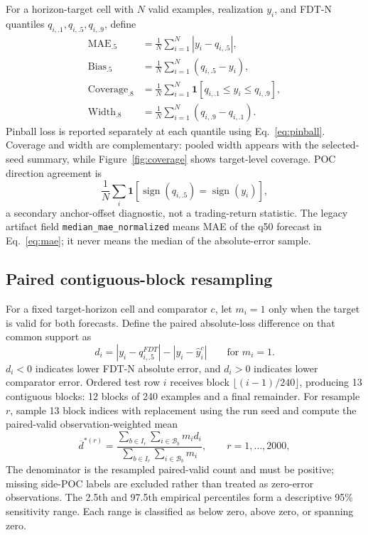 \documentclass[10pt]{article}
\newcommand{\ind}{\mathbf{1}}
\begin{document}
For a horizon-target cell with $N$ valid examples, realization $y_i$, and FDT-N quantiles
$q_{i,.1},q_{i,.5},q_{i,.9}$, define
\begin{align}
\operatorname{MAE}_{.5}&=\frac{1}{N}\sum_{i=1}^N|y_i-q_{i,.5}|,
\label{eq:mae}\\
\operatorname{Bias}_{.5}&=\frac{1}{N}\sum_{i=1}^N(q_{i,.5}-y_i),\\
\operatorname{Coverage}_{.8}&=\frac{1}{N}\sum_{i=1}^N
\ind[q_{i,.1}\le y_i\le q_{i,.9}],
\label{eq:coverage}\\
\operatorname{Width}_{.8}&=\frac{1}{N}\sum_{i=1}^N(q_{i,.9}-q_{i,.1}).
\label{eq:width}
\end{align}
Pinball loss is reported separately at each quantile using Eq.~\eqref{eq:pinball}. Coverage and width
are complementary: pooled width appears with the selected-seed summary, while
Figure~\ref{fig:coverage} shows target-level coverage. POC direction agreement is
\begin{equation}
\frac{1}{N}\sum_i\ind[\operatorname{sign}(q_{i,.5})=
\operatorname{sign}(y_i)],
\end{equation}
a secondary anchor-offset diagnostic, not a trading-return statistic. The legacy artifact field
{\small\texttt{median\_mae\_normalized}} means MAE of the q50 forecast in Eq.~\eqref{eq:mae}; it never
means the median of the absolute-error sample.

\subsection{Paired contiguous-block resampling}
\label{sec:resampling}

For a fixed target-horizon cell and comparator $c$, let $m_i=1$ only when the target is valid for
both forecasts. Define the paired absolute-loss difference on that common support as
\begin{equation}
d_i=|y_i-q_{i,.5}^{FDT}|-|y_i-\widehat y_i^c|\qquad\text{for }m_i=1.
\label{eq:paired-diff}
\end{equation}
$d_i<0$ indicates lower FDT-N absolute error, and $d_i>0$ indicates lower comparator error. Ordered
test row $i$ receives block
$\lfloor(i-1)/240\rfloor$, producing 13 contiguous blocks: 12 blocks of 240 examples and a final
remainder. For resample $r$, sample 13 block indices with replacement using the run seed and compute
the paired-valid observation-weighted mean
\begin{equation}
\overline d^{*(r)}=
\frac{\sum_{b\in I_r}\sum_{i\in\mathcal B_b}m_i d_i}
{\sum_{b\in I_r}\sum_{i\in\mathcal B_b}m_i},\qquad r=1,\ldots,2000,
\label{eq:block-bootstrap}
\end{equation}
The denominator is the resampled paired-valid count and must be positive; missing side-POC labels are
excluded rather than treated as zero-error observations.
The 2.5th and 97.5th empirical percentiles form a descriptive 95\% sensitivity range. Each range is
classified as below zero, above zero, or spanning zero.
\end{document}
